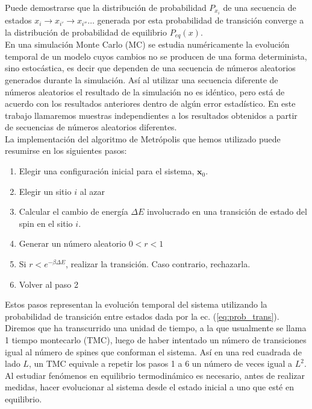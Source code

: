 Puede demostrarse \cite{binder_book2} que la distribución de probabilidad $P_{x_{i}}$ de una secuencia de estados $x_{i}\rightarrow x_{i'}\rightarrow x_{i''} \ldots${}
 generada por esta probabilidad de transición converge a la distribución de probabilidad de equilibrio $P_{eq}(x)$.\\
En una simulación Monte Carlo (MC) se estudia numéricamente la evolución temporal de un modelo cuyos cambios no se producen de una forma determinista,
 sino estocástica, es decir que dependen de una secuencia de números aleatorios generados durante la simulación. Así al utilizar
 una secuencia diferente de números aleatorios el resultado de la simulación no es idéntico, pero está de acuerdo con los resultados anteriores
 dentro de algún error estadístico. En este trabajo llamaremos muestras independientes a los resultados obtenidos a partir de secuencias de números
 aleatorios diferentes.\\
La implementación del algoritmo de Metrópolis que hemos utilizado puede resumirse en los siguientes pasos:

\begin{enumerate}
\item Elegir una configuración inicial para el sistema, $\mathbf{x}_0$.
\item Elegir un sitio $i$ al azar
\item Calcular el cambio de energía $\Delta E$ involucrado en una transición de estado del spin en el sitio $i$. 
\item Generar un número aleatorio $0<r<1$
\item Si $r<e^{-\beta \Delta E}$, realizar la transición. Caso contrario, rechazarla.
\item Volver al paso 2
\end{enumerate}


Estos pasos representan la evolución temporal del sistema utilizando la probabilidad de transición entre estados dada por la ec. (\ref{eq:prob_trans}).
Diremos que ha transcurrido una unidad de tiempo, a la que usualmente se llama 1 tiempo montecarlo (TMC), luego de haber intentado un número de transiciones igual
 al número de spines que conforman el sistema. Así en una red cuadrada de lado $L$, un TMC equivale a repetir los pasos 1 a 6 un número de veces
 igual a $L^{2}$.\\
Al estudiar fenómenos en equilibrio termodinámico es necesario, antes de realizar medidas, hacer evolucionar al sistema desde el estado inicial a uno que esté
 en equilibrio.\\

